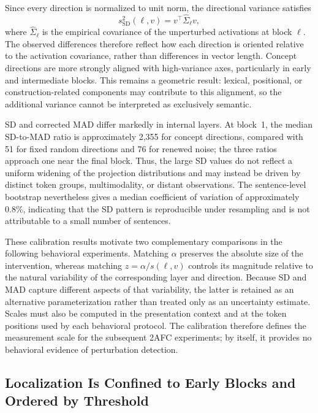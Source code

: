 Since every direction is normalized to unit norm, the directional variance
satisfies
\begin{equation}
s_{\mathrm{SD}}^2(\ell,v)
=
v^{\top}\widehat{\Sigma}_{\ell}v,
\label{eq:directional-variance}
\end{equation}
where $\widehat{\Sigma}_{\ell}$ is the empirical covariance of the
unperturbed activations at block $\ell$. The observed differences therefore
reflect how each direction is oriented relative to the activation
covariance, rather than differences in vector length. Concept directions
are more strongly aligned with high-variance axes, particularly in early
and intermediate blocks. This remains a geometric result: lexical,
positional, or construction-related components may contribute to this
alignment, so the additional variance cannot be interpreted as exclusively
semantic.

SD and corrected MAD differ markedly in internal layers. At block~1, the
median SD-to-MAD ratio is approximately 2,355 for concept directions,
compared with 51 for fixed random directions and 76 for renewed noise; the
three ratios approach one near the final block. Thus, the large SD values
do not reflect a uniform widening of the projection distributions and may
instead be driven by distinct token groups, multimodality, or distant
observations. The sentence-level bootstrap nevertheless gives a median
coefficient of variation of approximately 0.8\%, indicating that the SD
pattern is reproducible under resampling and is not attributable to a small
number of sentences.

These calibration results motivate two complementary comparisons in the
following behavioral experiments. Matching $\alpha$ preserves the absolute
size of the intervention, whereas matching
$z=\alpha/s(\ell,v)$ controls its magnitude relative to the natural
variability of the corresponding layer and direction. Because SD and MAD
capture different aspects of that variability, the latter is retained as
an alternative parameterization rather than treated only as an uncertainty
estimate. Scales must also be computed in the presentation context and at
the token positions used by each behavioral protocol. The calibration
therefore defines the measurement scale for the subsequent 2AFC experiments;
by itself, it provides no behavioral evidence of perturbation detection.

\subsection{Localization Is Confined to Early Blocks and Ordered by Threshold}
\label{sec:localization}

